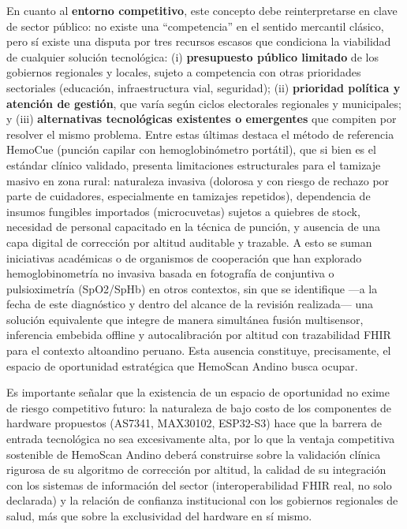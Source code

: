 \documentclass[11pt,a4paper]{article}
\begin{document}
En cuanto al \textbf{entorno competitivo}, este concepto debe reinterpretarse en clave de sector público: no existe una ``competencia'' en el sentido mercantil clásico, pero sí existe una disputa por tres recursos escasos que condiciona la viabilidad de cualquier solución tecnológica: (i) \textbf{presupuesto público limitado} de los gobiernos regionales y locales, sujeto a competencia con otras prioridades sectoriales (educación, infraestructura vial, seguridad); (ii) \textbf{prioridad política y atención de gestión}, que varía según ciclos electorales regionales y municipales; y (iii) \textbf{alternativas tecnológicas existentes o emergentes} que compiten por resolver el mismo problema. Entre estas últimas destaca el método de referencia HemoCue (punción capilar con hemoglobinómetro portátil), que si bien es el estándar clínico validado, presenta limitaciones estructurales para el tamizaje masivo en zona rural: naturaleza invasiva (dolorosa y con riesgo de rechazo por parte de cuidadores, especialmente en tamizajes repetidos), dependencia de insumos fungibles importados (microcuvetas) sujetos a quiebres de stock, necesidad de personal capacitado en la técnica de punción, y ausencia de una capa digital de corrección por altitud auditable y trazable. A esto se suman iniciativas académicas o de organismos de cooperación que han explorado hemoglobinometría no invasiva basada en fotografía de conjuntiva o pulsioximetría (SpO2/SpHb) en otros contextos, sin que se identifique ---a la fecha de este diagnóstico y dentro del alcance de la revisión realizada--- una solución equivalente que integre de manera simultánea fusión multisensor, inferencia embebida offline y autocalibración por altitud con trazabilidad FHIR para el contexto altoandino peruano. Esta ausencia constituye, precisamente, el espacio de oportunidad estratégica que HemoScan Andino busca ocupar.

Es importante señalar que la existencia de un espacio de oportunidad no exime de riesgo competitivo futuro: la naturaleza de bajo costo de los componentes de hardware propuestos (AS7341, MAX30102, ESP32-S3) hace que la barrera de entrada tecnológica no sea excesivamente alta, por lo que la ventaja competitiva sostenible de HemoScan Andino deberá construirse sobre la validación clínica rigurosa de su algoritmo de corrección por altitud, la calidad de su integración con los sistemas de información del sector (interoperabilidad FHIR real, no solo declarada) y la relación de confianza institucional con los gobiernos regionales de salud, más que sobre la exclusividad del hardware en sí mismo.
\end{document}
